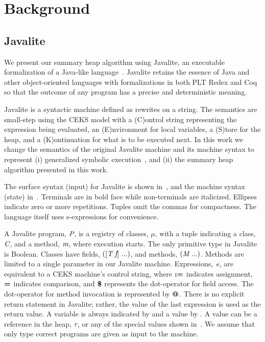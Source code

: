 \section{Background}
\subsection{Javalite}
We present our summary heap algorithm using Javalite, an
executable formalization of a Java-like language~\cite{saints-MS}. Javalite retains 
the essence of Java and other object-oriented languages with formalizations 
in both PLT Redex and Coq so that the outcome of any program has a precise
and deterministic meaning.

Javalite is a syntactic machine defined as rewrites on a string.  The
semantics are small-step using the CEKS model with a (C)ontrol string
representing the expression being evaluated, an (E)nvironment for
local variables, a (S)tore for the heap, and a (K)ontinuation for what
is to be executed next.  In this work we change the semantics of the original
 Javalite machine and its machine syntax to represent (i) generalized
symbolic execution~\cite{GSE03}, and (ii) the summary heap algorithm
presented in this work.

The surface syntax (input) for Javalite is shown 
in~, and the machine syntax (state)
in~. Terminals are in bold face while
non-terminals are italicized. Ellipses indicate zero or more
repetitions. Tuples omit the commas for compactness. The language
itself uses s-expressions for convenience.




A Javalite program, $\emph{P}$, is a registry of classes, $\mu$, with
a tuple indicating a class, $\emph{C}$, and a method, $\emph{m}$,
where execution starts. The only primitive type in Javalite is
Boolean. Classes have fields, $([\emph{T}\ \emph{f}]\ ...)$, and
methods, $(\emph{M}\ ...)$. Methods are limited to a single
parameter in our Javalite machine. Expressions, $\emph{e}$, are 
equivalent to a CEKS machine's control string, 
where $\textbf{:=}$ indicates assignment, $\textbf{=}$ indicates comparison,
and $\textbf{\$}$ represents the dot-operator for field access. The dot-operator
for method invocation is represented by $\textbf{@}$. There is no explicit return
statement in Javalite; rather, the value of the last expression is
used as the return value. A variable is always indicated by 
and a value by . A value can be a reference in the heap,
$\emph{r}$, or any of the special values shown in~. 
We assume that only
type correct programs are given as input to the machine.

